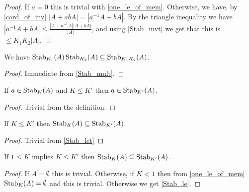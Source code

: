 \begin{proof}
    \leanok
    If $a = 0$ this is trivial with \ref{one_le_of_mem}. Otherwise, we have, by \ref{card_of_inv}
    $|A + a b A| = |a^{-1} A + b A|$. By the triangle inequality we have
    $|a^{-1} A + b A| \leq \frac{|A + a^{-1} A| |A + b A|}{|A|}$, and using \ref{Stab_invt} we get that this is
    $\leq K_1 K_2 |A|$.
\end{proof}

\begin{lemma}
    \label{Stab_mul}
    \leanok
    We have $\operatorname{\operatorname{Stab}}_{K_1}(A) \operatorname{\operatorname{Stab}}_{K_2}(A) \subseteq \operatorname{\operatorname{Stab}}_{K_1 K_2}(A)$.
\end{lemma}

\begin{proof}
    \leanok
    Immediate from \ref{Stab_mult}.
\end{proof}

\begin{lemma}
    \label{Stab_let}
    \leanok
    If $a \in \operatorname{\operatorname{Stab}}_K(A)$ and $K \leq K'$ then $a \in \operatorname{\operatorname{Stab}}_{K'}(A)$.
\end{lemma}

\begin{proof}
    \leanok
    Trivial from the definition.
\end{proof}

\begin{lemma}
    \label{Stab_le}
    \leanok
    If $K \leq K'$ then $\operatorname{\operatorname{Stab}}_K(A) \subseteq \operatorname{\operatorname{Stab}}_{K'}(A)$.
\end{lemma}

\begin{proof}
    \leanok
    Trivial from \ref{Stab_let}
\end{proof}

\begin{lemma}
    \label{Stab_le_2}
    \leanok
    If $1 \leq K$ implies $K \leq K'$ then $\operatorname{\operatorname{Stab}}_K(A) \subseteq \operatorname{\operatorname{Stab}}_{K'}(A)$.
\end{lemma}

\begin{proof}
    \leanok
    If $A = \emptyset$ this is trivial.
    Otherwise, if $K < 1$ then from \ref{one_le_of_mem} $\operatorname{\operatorname{Stab}}_K(A) = \emptyset$ and this is trivial.
    Otherwise we get \ref{Stab_le}.
\end{proof}


